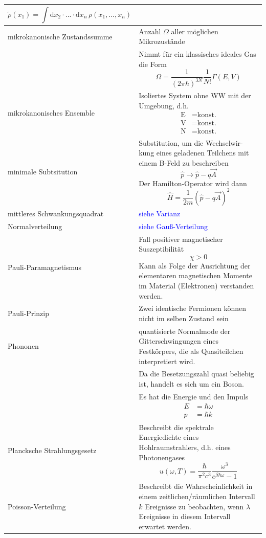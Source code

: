 \documentclass{article}
\newcommand{\diff}{\mathrm{d}}
\begin{document}
\begin{xltabular}{\linewidth}{p{6cm}|X}
			$$\tilde{\rho}(x_1) = \int \diff x_2 \cdot ...\cdot \diff x_n\, \rho(x_1,...,x_n)$$ \\
	\hline
		mikrokanonische Zustandssumme & Anzahl $\Omega$ aller möglichen Mikrozustände \\
		& Nimmt für ein klassisches ideales Gas die Form
			$$\Omega = \frac{1}{(2\pi\hbar)^{3N}}\frac{1}{N!}\Gamma(E,V)$$ \\
	\hline
		mikrokanonisches Ensemble & Isoliertes System ohne WW mit der Umgebung, d.h.
			{\begin{align*}
				\text{E} &= \text{konst.}\\
				\text{V} &= \text{konst.}\\
				\text{N} &= \text{konst.}
			\end{align*}} \\
	\hline
		minimale Subtsitution & Substitution, um die Wechselwir-
kung eines geladenen Teilchens mit einem B-Feld zu
beschreiben
			$$\hat{p} \to \hat{p} - q\vec{A}$$ 
		Der Hamilton-Operator wird dann
			$$\hat{H} = \frac{1}{2m} (\hat{p} - q\vec{A})^2$$ \\
	\hline
		mittleres Schwankungsquadrat & \textcolor{blue}{siehe Varianz} \\
	\hline
		Normalverteilung & \textcolor{blue}{siehe Gauß-Verteilung} \\
	\hline
		Pauli-Paramagnetismus & Fall positiver magnetischer Suszeptibilität
			$$\chi > 0$$
		Kann als Folge der Ausrichtung der elementaren magnetischen Momente im Material (Elektronen) verstanden werden. \\
	\hline
		Pauli-Prinzip & Zwei identische Fermionen können nicht im selben Zustand sein \\
	\hline
		Phononen & quantisierte Normalmode der Gitterschwingungen eines Festkörpers, die als Quasiteilchen interpretiert wird. \\
		& Da die Besetzungszahl quasi beliebig ist, handelt es sich um ein Boson.\\
		& Es hat die Energie und den Impuls
			{\begin{align*}
				E &= \hbar\omega \\
				p &= \hbar k
			\end{align*}} \\
	\hline
		Plancksche Strahlungsgesetz & Beschreibt die spektrale Energiedichte eines Hohlraumstrahlers, d.h. eines Photonengases
			$$u(\omega, T) = \frac{\hbar}{\pi^2 c^3} \frac{\omega^3}{e^{\beta\hbar\omega} - 1}$$ \\
	\hline
		Poisson-Verteilung & Beschreibt die Wahrscheinlichkeit in einem zeitlichen/räumlichen Intervall $k$ Ereignisse zu beobachten, wenn $\lambda$ Ereignisse in diesem Intervall erwartet werden.

\end{xltabular}
\end{document}
